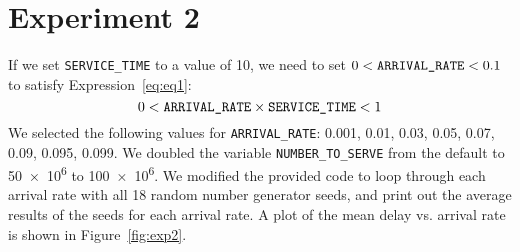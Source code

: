 \section*{Experiment 2}
If we set \texttt{SERVICE\_TIME} to a value of 10, we need to set $0 < \text{\texttt{ARRIVAL\_RATE}} < 0.1$ to satisfy Expression~\ref{eq:eq1}:
\begin{equation}
	0 < \text{\texttt{ARRIVAL\_RATE}} \times \text{\texttt{SERVICE\_TIME}} < 1
	\label{eq:eq1}
\end{equation}
We selected the following values for \texttt{ARRIVAL\_RATE}: 0.001, 0.01, 0.03, 0.05, 0.07, 0.09, 0.095, 0.099. We doubled the variable \texttt{NUMBER\_TO\_SERVE} from the default to \num{50e6} to \num{100e6}. We modified the provided code to loop through each arrival rate with all 18 random number generator seeds, and print out the average results of the seeds for each arrival rate.
A plot of the mean delay vs. arrival rate is shown in Figure~\ref{fig:exp2}.

